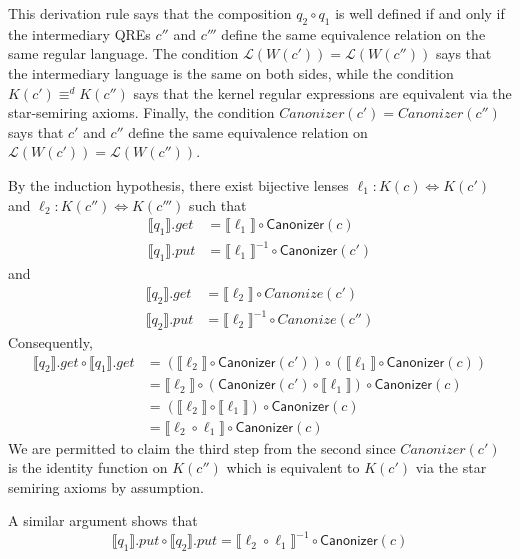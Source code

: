 \documentclass{svproc}
\newcommand{\kw}[1]{\ensuremath{\mathsf{#1}}}
\newcommand{\canonizer}{\ensuremath{\kw{Canonizer}}}
\begin{document}
This derivation rule says that the composition $q_2 \circ q_1$ is well defined
if and only if the intermediary QREs $c''$ and $c'''$ define the same
equivalence relation on the same regular language. The condition
$\mathcal{L}(W(c')) = \mathcal{L}(W(c''))$ says that the intermediary language
is the same on both sides, while the condition $K(c') \equiv^d K(c'')$ says that
the kernel regular expressions are equivalent via the star-semiring axioms.
Finally, the condition $\mathit{Canonizer}(c') = \mathit{Canonizer}(c'')$ says
that $c'$ and $c''$ define the same equivalence relation on $\mathcal{L}(W(c'))=
\mathcal{L}(W(c''))$.

  By the induction hypothesis, there exist bijective lenses
  $\ell_1 :
  K(c) \Leftrightarrow K(c')$ and $\ell_2 : K(c'') \Leftrightarrow K(c''')$ such
  that
  \begin{align*}
\llbracket q_1 \rrbracket.get &= \llbracket \ell_1 \rrbracket \circ
\canonizer(c)\\
\llbracket q_1 \rrbracket.put &= {\llbracket \ell_1 \rrbracket}^{-1} \circ
\canonizer(c')
\end{align*}
and
\begin{align*}
\llbracket q_2 \rrbracket.get &= \llbracket \ell_2 \rrbracket \circ
Canonize(c')\\
\llbracket q_2 \rrbracket.put &= {\llbracket \ell_2 \rrbracket}^{-1} \circ
Canonize(c'')
\end{align*}
Consequently,
\begin{align*}
\llbracket q_2 \rrbracket.get \circ \llbracket q_1 \rrbracket.get &=
(\llbracket \ell_2 \rrbracket \circ \canonizer(c')) \circ (\llbracket \ell_1
\rrbracket \circ \canonizer(c))\\
&= \llbracket \ell_2 \rrbracket \circ (\canonizer(c') \circ \llbracket \ell_1
\rrbracket) \circ \canonizer(c)\\
&= (\llbracket \ell_2 \rrbracket \circ \llbracket \ell_1 \rrbracket) \circ
\canonizer(c)\\
&= \llbracket \ell_2  \circ  \ell_1 \rrbracket \circ
\canonizer(c)
\end{align*} 
We are permitted to claim the third step from the second since
$\mathit{Canonizer(c')}$ is the identity function on $K(c'')$ which is
equivalent to $K(c')$ via the star semiring axioms by assumption.

A similar argument shows that 
$$\llbracket q_1 \rrbracket.put \circ \llbracket q_2 \rrbracket.put =
\llbracket \ell_2  \circ  \ell_1 \rrbracket^{-1} \circ
\canonizer(c)$$
\end{document}
